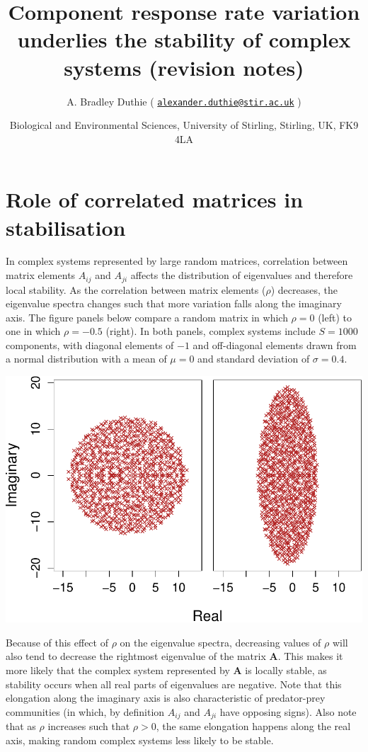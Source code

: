 \documentclass[]{article}
\title{Component response rate variation underlies the stability of complex
systems (revision notes)}
\author{A. Bradley Duthie (
\href{mailto:alexander.duthie@stir.ac.uk}{\nolinkurl{alexander.duthie@stir.ac.uk}}
)}
\date{Biological and Environmental Sciences, University of Stirling, Stirling,
UK, FK9 4LA}
\begin{document}
\maketitle

\section{Role of correlated matrices in
stabilisation}\label{role-of-correlated-matrices-in-stabilisation}

In complex systems represented by large random matrices, correlation
between matrix elements \(A_{ij}\) and \(A_{ji}\) affects the
distribution of eigenvalues and therefore local stability. As the
correlation between matrix elements (\(\rho\)) decreases, the eigenvalue
spectra changes such that more variation falls along the imaginary axis.
The figure panels below compare a random matrix in which \(\rho = 0\)
(left) to one in which \(\rho = -0.5\) (right). In both panels, complex
systems include \(S = 1000\) components, with diagonal elements of
\(-1\) and off-diagonal elements drawn from a normal distribution with a
mean of \(\mu = 0\) and standard deviation of \(\sigma = 0.4\).

\includegraphics{revision_notes_files/figure-latex/unnamed-chunk-2-1.pdf}

Because of this effect of \(\rho\) on the eigenvalue spectra, decreasing
values of \(\rho\) will also tend to decrease the rightmost eigenvalue
of the matrix \(\textbf{A}\). This makes it more likely that the complex
system represented by \(\textbf{A}\) is locally stable, as stability
occurs when all real parts of eigenvalues are negative. Note that this
elongation along the imaginary axis is also characteristic of
predator-prey communities (in which, by definition \(A_{ij}\) and
\(A_{ji}\) have opposing signs). Also note that as \(\rho\) increases
such that \(\rho > 0\), the same elongation happens along the real axis,
making random complex systems less likely to be stable.
\end{document}
